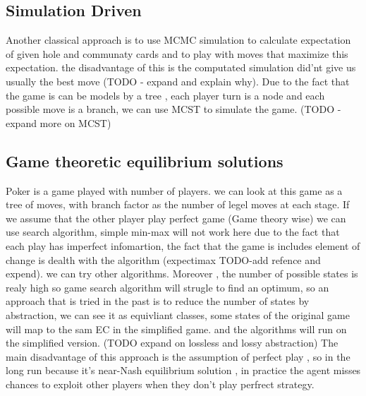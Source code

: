\documentclass{article}
\begin{document}
\subsection{Simulation Driven}
Another classical approach is to use MCMC simulation to calculate expectation of given hole and communaty cards and to play with moves that maximize this expectation.
the disadvantage of this is the computated simulation did'nt give us usually the best move (TODO - expand and explain why).
Due to the fact that the game is can be models by a tree , each player turn is a node and each possible move is a branch, we can use MCST to simulate the game.
(TODO - expand more on MCST)
\subsection{Game theoretic equilibrium solutions}
Poker is a game played with number of players. we can look at this game as a tree of moves, with branch factor as the number of legel moves at each stage.
If we assume that the other player play perfect game (Game theory wise) we can use search algorithm, simple min-max will not work here due to the fact
that each play has imperfect infomartion, the fact that the game is includes element of change is dealth with the algorithm (expectimax TODO-add refence and expend). we can try other algorithms.
Moreover , the number of possible states is realy high so game search algorithm will strugle to find an optimum, so an approach that is tried in the past is to reduce
the number of states by abstraction, we can see it as equivliant classes, some states of the original game will map to the sam EC in the simplified game.
and the algorithms will run on the simplified version. (TODO expand on lossless and lossy abstraction)
The main disadvantage of this approach is the assumption of perfect play , so in the long run because it's near-Nash equilibrium solution ,
 in practice the agent misses chances to exploit other players when they don't play perfrect strategy.
\end{document}
